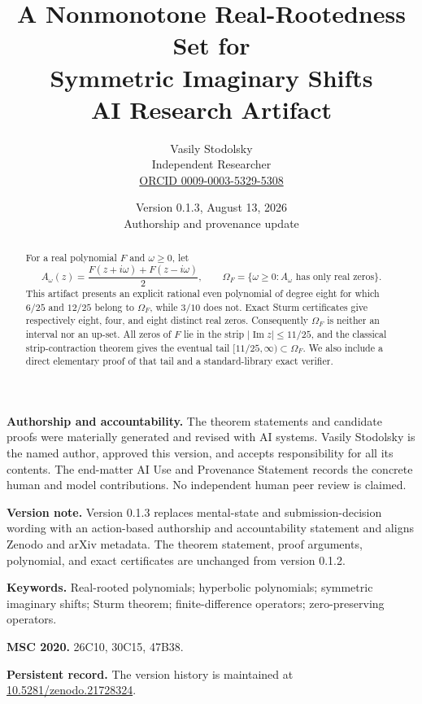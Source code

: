 \documentclass[11pt]{article}
\title{\textbf{A Nonmonotone Real-Rootedness Set for\\
Symmetric Imaginary Shifts}\\[0.7em]
\large\textnormal{AI Research Artifact}}
\author{Vasily Stodolsky\\
\small Independent Researcher\\
\small \href{https://orcid.org/0009-0003-5329-5308}
{ORCID 0009-0003-5329-5308}}
\date{Version 0.1.3, August 13, 2026\\Authorship and provenance update}
\newcommand{\OmegaF}{\Omega_F}
\begin{document}
\maketitle

\begin{center}
\begin{minipage}{0.89\textwidth}
\small
\textbf{Authorship and accountability.}
The theorem statements and candidate proofs were materially generated and
revised with AI systems. Vasily Stodolsky is the named author, approved this
version, and accepts responsibility for all its contents. The end-matter AI Use
and Provenance Statement records the concrete human and model contributions.
No independent human peer review is claimed.

\smallskip
\textbf{Version note.}
Version 0.1.3 replaces mental-state and submission-decision wording with an
action-based authorship and accountability statement and aligns Zenodo and
arXiv metadata. The theorem statement, proof arguments, polynomial, and exact
certificates are unchanged from version 0.1.2.
\end{minipage}
\end{center}

\begin{abstract}
For a real polynomial $F$ and $\omega\geq 0$, let
\[
  A_\omega(z)=\frac{F(z+i\omega)+F(z-i\omega)}{2},
  \qquad
  \OmegaF=\{\omega\geq0:A_\omega\text{ has only real zeros}\}.
\]
This artifact presents an explicit rational even polynomial of degree eight for which
$6/25$ and $12/25$ belong to $\OmegaF$, while $3/10$ does not. Exact Sturm
certificates give respectively eight, four, and eight distinct real zeros.
Consequently $\OmegaF$ is neither an interval nor an up-set. All zeros of
$F$ lie in the strip $|\operatorname{Im}z|\leq11/25$, and the classical
strip-contraction theorem gives the eventual tail
$[11/25,\infty)\subset\OmegaF$. We also include a direct elementary proof
of that tail and a standard-library exact verifier.
\end{abstract}

\medskip
\noindent\textbf{Keywords.}
Real-rooted polynomials; hyperbolic polynomials; symmetric imaginary shifts;
Sturm theorem; finite-difference operators; zero-preserving operators.

\medskip
\noindent\textbf{MSC 2020.}
26C10, 30C15, 47B38.

\medskip
\noindent\textbf{Persistent record.}
The version history is maintained at
\href{https://doi.org/10.5281/zenodo.21728324}
{10.5281/\allowbreak zenodo.21728324}.
\end{document}
